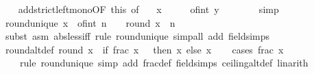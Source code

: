\begin{isabellebody}
\ \ \isamarkupfalse%
\ add{\isacharunderscore}{\kern0pt}strict{\isacharunderscore}{\kern0pt}left{\isacharunderscore}{\kern0pt}mono{\isacharbrackleft}{\kern0pt}OF\ this{\isacharcomma}{\kern0pt}\ of\ {}{\isacharbrackright}{\kern0pt}\ \isamarkupfalse%
\ {\isachardoublequoteopen}x\ {\isacharplus}{\kern0pt}\ {}\ {\isacharslash}{\kern0pt}\ {}\ {\isacharless}{\kern0pt}\ of{\isacharunderscore}{\kern0pt}int\ y\ {\isacharplus}{\kern0pt}\ {}{\isachardoublequoteclose}\isanewline
\ \ \ \ \isamarkupfalse%
\ simp\isanewline
{}\isamarkupfalse%
%
\endisatagproof
{\isafoldproof}%
%
\isadelimproof
\isanewline
%
\endisadelimproof
\isanewline
{}\isamarkupfalse%
\ round{\isacharunderscore}{\kern0pt}unique{\isacharprime}{\kern0pt}{\isacharcolon}{\kern0pt}\ {\isachardoublequoteopen}{\isasymbar}x\ {\isacharminus}{\kern0pt}\ of{\isacharunderscore}{\kern0pt}int\ n{\isasymbar}\ {\isacharless}{\kern0pt}\ {}{\isacharslash}{\kern0pt}{}\ {\isasymLongrightarrow}\ round\ x\ {\isacharequal}{\kern0pt}\ n{\isachardoublequoteclose}\isanewline
%
\isadelimproof
\ \ %
\endisadelimproof
%
\isatagproof
{}\isamarkupfalse%
\ {\isacharparenleft}{\kern0pt}subst\ {\isacharparenleft}{\kern0pt}asm{\isacharparenright}{\kern0pt}\ abs{\isacharunderscore}{\kern0pt}less{\isacharunderscore}{\kern0pt}iff{\isacharcomma}{\kern0pt}\ rule\ round{\isacharunderscore}{\kern0pt}unique{\isacharparenright}{\kern0pt}\ {\isacharparenleft}{\kern0pt}simp{\isacharunderscore}{\kern0pt}all\ add{\isacharcolon}{\kern0pt}\ field{\isacharunderscore}{\kern0pt}simps{\isacharparenright}{\kern0pt}%
\endisatagproof
{\isafoldproof}%
%
\isadelimproof
\isanewline
%
\endisadelimproof
\isanewline
{}\isamarkupfalse%
\ round{\isacharunderscore}{\kern0pt}altdef{\isacharcolon}{\kern0pt}\ {\isachardoublequoteopen}round\ x\ {\isacharequal}{\kern0pt}\ {\isacharparenleft}{\kern0pt}if\ frac\ x\ {\isasymge}\ {}{\isacharslash}{\kern0pt}{}\ then\ {\isasymlceil}x{\isasymrceil}\ else\ {\isasymlfloor}x{\isasymrfloor}{\isacharparenright}{\kern0pt}{\isachardoublequoteclose}\isanewline
%
\isadelimproof
\ \ %
\endisadelimproof
%
\isatagproof
{}\isamarkupfalse%
\ {\isacharparenleft}{\kern0pt}cases\ {\isachardoublequoteopen}frac\ x\ {\isasymge}\ {}{\isacharslash}{\kern0pt}{}{\isachardoublequoteclose}{\isacharparenright}{\kern0pt}\isanewline
\ \ \ \ {\isacharparenleft}{\kern0pt}rule\ round{\isacharunderscore}{\kern0pt}unique{\isacharcomma}{\kern0pt}\ {\isacharparenleft}{\kern0pt}{\isacharparenleft}{\kern0pt}simp\ add{\isacharcolon}{\kern0pt}\ frac{\isacharunderscore}{\kern0pt}def\ field{\isacharunderscore}{\kern0pt}simps\ ceiling{\isacharunderscore}{\kern0pt}altdef{\isacharsemicolon}{\kern0pt}\ linarith{\isacharparenright}{\kern0pt}{\isacharplus}{\kern0pt}{\isacharparenright}{\kern0pt}{\isacharbrackleft}{\kern0pt}{}{\isacharbrackright}{\kern0pt}{\isacharparenright}{\kern0pt}{\isacharplus}{\kern0pt}%

\end{isabellebody}
